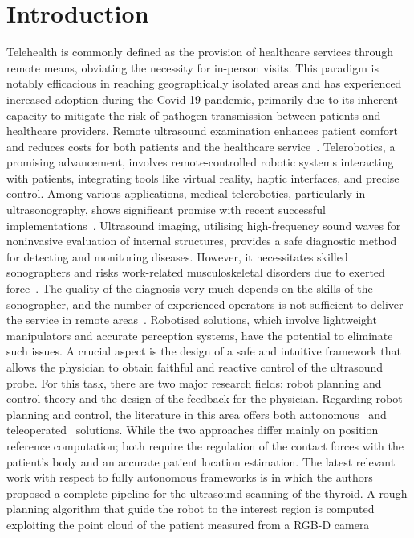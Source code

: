 \chapter{Introduction}

Telehealth is commonly defined as the provision of healthcare services through remote means, obviating the necessity for in-person visits.
This paradigm is notably efficacious in reaching geographically isolated areas and has experienced increased adoption during the Covid-19 pandemic, primarily due to its inherent capacity to mitigate the risk of pathogen transmission between patients and healthcare providers.
Remote ultrasound examination enhances patient comfort and reduces costs for both patients and the healthcare service~\cite{eu2018market,who2022consolidated}.
Telerobotics, a promising advancement, involves remote-controlled robotic systems interacting with patients, integrating tools like virtual reality, haptic interfaces, and precise control. Among various applications, medical telerobotics, particularly in ultrasonography, shows significant promise with recent successful implementations~\cite{avgousti2016medical,jiang2023robotic}.
Ultrasound imaging, utilising high-frequency sound waves for noninvasive evaluation of internal structures, provides a safe diagnostic method for detecting and monitoring diseases. However, it necessitates skilled sonographers and risks work-related musculoskeletal disorders due to exerted force~\cite{coffin2014work}. The quality of the diagnosis very much depends on the skills of the sonographer, and the
number of experienced operators is not sufficient to deliver the
service in remote areas~\cite{li2021overview}. 
Robotised solutions, which involve lightweight manipulators and accurate perception
systems, have the potential to eliminate such issues. A crucial aspect is the design of a safe and intuitive framework that allows the physician to obtain faithful and reactive control of the ultrasound probe. For this task, there are two major research fields: robot planning and control theory and the design of the feedback for the physician. Regarding robot planning and control, the literature in this area offers  both
autonomous~\cite{su2024fully,li2021overview,roshan2022robotic} and teleoperated~\cite{vonhaxthausen2021medical,jiang2023robotic} solutions. While the two
approaches differ mainly on position reference computation; both
require the regulation of the contact forces with the patient's body and an accurate patient location estimation. The latest relevant work with respect to fully autonomous frameworks is  \cite{su2024fully} in which the authors proposed a complete pipeline for the ultrasound scanning of the thyroid. A rough planning algorithm that guide the robot to the interest region is computed exploiting the point cloud of the patient measured from a RGB-D camera
